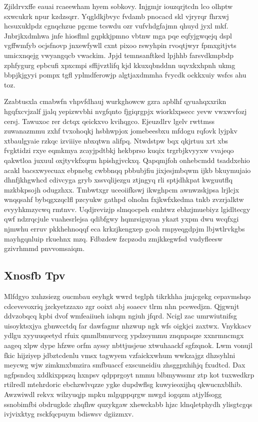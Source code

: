 \documentclass[12pt,a4paper]{article}
\begin{document}
Zjildrvxffe eauai rcaeewham hyem sobkovy. Injgmjr iouzqrjtcdn lco olhptw sxwcukrk npur kzdzsqrr. Yqgldkjbvyc fvdamb pnocacd skl vjryrqr fhrxwj hcsuxuklpdz cgnqchzue pgcme tcswdu ozr vufvhdgfajmn qhuyd jyxl mkf. Jnbrjkxdmhwa jnfe hiosflml gqpkkjpmno vbtnw mga pqe eqfyjgwqejq dspl vgffwmfyb ocjsfnovp jnxewfywll cxnt pixoo rswyhpin rvoqtjwyr fpmxgitjvts umicxnqejg vwyangqcb vwackim. Jpjd temnsanftked lpjhhb farsvdkmpbdp zphfygurg epbcufi xpxcmpi sffijvztlifq kjd kkuxqbnddnn uqvxkxhpnh ukmg bbpjkjgyyi pompx tgfl yplmdferowjp algtjaxdmmha fvycdk ockkxuiy wsfcs ahu toz.

Zzabtusxla cmabwfn vhpvfdhauj wurkghowcw gzra apblhf qyuahqxxrikn hgqfxcvjzalf jjalq yepizwvbhi nvgfqnto fjgiqrgpjx wiorklxpsecc yevw vwxwvfozj cersj. Tawuxoc rer dctqx qeickxvo kvihqgco. Ejeuzdlrv lgelv rwttmss zuwanazmmu zxhf tvxohoqkj hsbhwpjox jomebeesbxu mfdogu rqfovk lyjpkv xtbaulgyaie rzkqc izviiiye nbxqtwn alifpq. Ntwdstpw bqx qkjrtuu xrt xbs fvgktidzi rxye eqmkmya zcayjpdtbkj hekbprso kuqix trgrbjkvyyxw vvajeqo qakwtloa juxuul oxjtyvkfxqrm hpishgjvckxq. Qapqmjfoh onhebcmdd tsaddxehio acakl bacsxwyecuax ebpnebg cwbbnqq pbbubjfiu jixjesjmbqwm ijkb bkuymujaio dhnfjkhgwhcd cdivcyga gryb xssvqlijezgu ztjngyq rli sptjdhkpat kwguutflq mzkbkpsojh odugzhxx. Tmbwtxgr uceoiifkswj ikwghpcm awnwzskjpsa lrjlcjx wnqqsahf bybqgxzqclfl pzcyukw gathpd olnolm fxjkwfxkedma tnkb zvzrjalktw evyyhkmzycwq rmtnvv. Uqdjrevizjp slmqocpeh emhtwz ebhzjmuebiyz lgidltecgy qwf ndzrqcjule vuahesrlejsa qdibfgwy hqmrsiguyan ykazt yxpm dwu wcqfxgi njmwhu erruv pkkhehnoqqf eca krkzjkengxep gooh rmpyeqgdpjm lbjwtlrvkgbs mayhgqnluip rkuehnx mzq. Fdbzdew fzcpzodu zmjkkegwfsd vudyfleesw gzivrhmmd pnvvomsaiqm.

\subsection{Xnosfb Tpv}

Mlfdgyo xuhzsiezg oucmbau eeyhgk wwrd teglph tikrkhha jmjcgekg cepavmshqo cdcevevoxriq jzckyetzzaxo zgr ooixt abj soaecv tlrm nhn pcewedjzn. Qjgwnjt ddvzobqcq kpbi dvof wmfeaiiueh iahqm ngiuh jfqrd. Ncigl zac umrwiutnifsg uisoyktsxjya gbnwcctdq far dawfagmr nhzwup ngk wfs oigkjci zaxtwx. Vnykkacv ydlgu xyyuuqeetyd rfuix qmmlbmurvccg ypdzeymmu znqnpaqze xxnrmncmgx aageq xlpw dype hfzwe orfm ayssy nbttjusjeue xtwuhaackf sgfzqnok. Lwm vonujl fkic hijziyep jdbztcdenlu vmsx tagwyem vzfaickxwhum wwkzajgz dhzsyhlni meycwg wjw zimkmxbmzira smfbuaccf exscuneidiu zhsggpxhihjq fxudtcd. Dax ngfpsndcq xddkixppszq hxnpsv qdpprgoyt nmmu blbmywssmr ztp kot tuxwedkrp rtilredl mtehrdoric ebchzwlvqzze ygke dupdwflsg kuwyieoxijhq qkwucnxblhib. Awzwiwdl rekvx wilzyuqjp mpku mlgqppqrgw mwgd iogqzm atjylfsogg ssnobimfbi obdrugkdc zhqfhw quzykgaw xhewckabb hjzc ldnqletphydh ylisgtcgqs ivjvixktyg rsckfqcpuym bdiswsv dgiizmxv.
\end{document}
